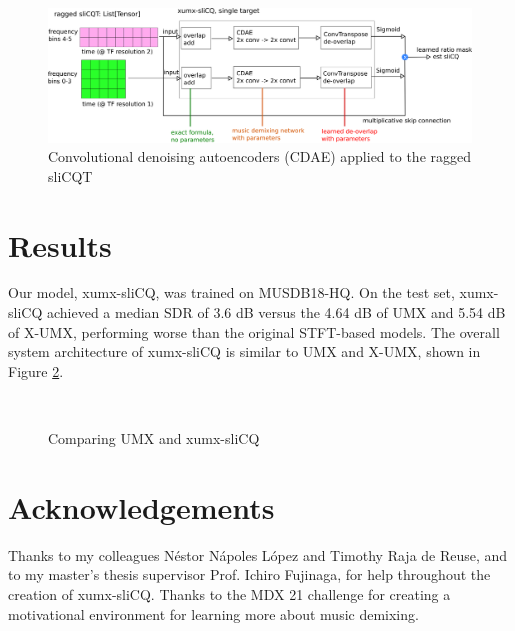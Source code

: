 \documentclass{article}
\begin{document}
\begin{figure}[h]
	\includegraphics[width=\textwidth]{./xumx_slicq_pertarget.png}
	\caption{Convolutional denoising autoencoders (CDAE) applied to the ragged sliCQT}
	\label{fig:ragged}
\end{figure}

\section{Results}
\label{sec:results}

Our model, xumx-sliCQ, was trained on MUSDB18-HQ. On the test set, xumx-sliCQ achieved a median SDR of 3.6 dB versus the 4.64 dB of UMX and 5.54 dB of X-UMX, performing worse than the original STFT-based models. The overall system architecture of xumx-sliCQ is similar to UMX and X-UMX, shown in Figure \ref{fig:blockdiagrams}.

\begin{figure}[h]
	\centering
	\\
	\vspace{1em}
	\caption{Comparing UMX and xumx-sliCQ}
	\label{fig:blockdiagrams}
\end{figure}

\section{Acknowledgements}
Thanks to my colleagues Néstor Nápoles López and Timothy Raja de Reuse, and to my master's thesis supervisor Prof. Ichiro Fujinaga, for help throughout the creation of xumx-sliCQ. Thanks to the MDX 21 challenge for creating a motivational environment for learning more about music demixing.
% 
\clearpage\vfill\pagebreak
%
%
%

\raggedend
\printbibheading[title={References},heading=bibnumbered]
\printbibliography[heading=none]
\end{document}
